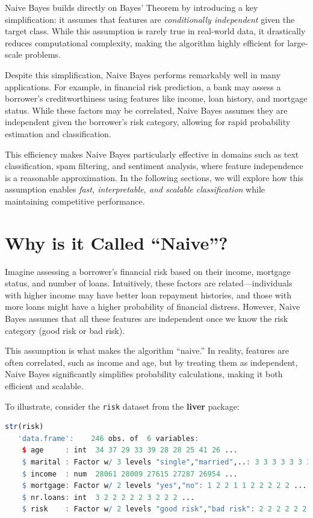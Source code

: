 \documentclass[
  11pt,
]{book}
\newcommand{\passthrough}[1]{#1}
\theoremstyle{definition}
\theoremstyle{definition}
\theoremstyle{definition}
\theoremstyle{definition}
\theoremstyle{remark}
\begin{document}
Naive Bayes builds directly on Bayes' Theorem by introducing a key simplification: it assumes that features are \emph{conditionally independent} given the target class. While this assumption is rarely true in real-world data, it drastically reduces computational complexity, making the algorithm highly efficient for large-scale problems.

Despite this simplification, Naive Bayes performs remarkably well in many applications. For example, in financial risk prediction, a bank may assess a borrower's creditworthiness using features like income, loan history, and mortgage status. While these factors may be correlated, Naive Bayes assumes they are independent given the borrower's risk category, allowing for rapid probability estimation and classification.

This efficiency makes Naive Bayes particularly effective in domains such as text classification, spam filtering, and sentiment analysis, where feature independence is a reasonable approximation. In the following sections, we will explore how this assumption enables \emph{fast, interpretable, and scalable classification} while maintaining competitive performance.

\section{Why is it Called ``Naive''?}\label{why-is-it-called-naive}

Imagine assessing a borrower's financial risk based on their income, mortgage status, and number of loans. Intuitively, these factors are related---individuals with higher income may have better loan repayment histories, and those with more loans might have a higher probability of financial distress. However, Naive Bayes assumes that all these features are independent once we know the risk category (good risk or bad risk).

This assumption is what makes the algorithm ``naive.'' In reality, features are often correlated, such as income and age, but by treating them as independent, Naive Bayes significantly simplifies probability calculations, making it both efficient and scalable.

To illustrate, consider the \passthrough{\lstinline!risk!} dataset from the \textbf{liver} package:

\begin{lstlisting}[language=R]
str(risk)
   'data.frame':    246 obs. of  6 variables:
    $ age     : int  34 37 29 33 39 28 28 25 41 26 ...
    $ marital : Factor w/ 3 levels "single","married",..: 3 3 3 3 3 3 3 3 3 3 ...
    $ income  : num  28061 28009 27615 27287 26954 ...
    $ mortgage: Factor w/ 2 levels "yes","no": 1 2 2 1 1 2 2 2 2 2 ...
    $ nr.loans: int  3 2 2 2 2 2 3 2 2 2 ...
    $ risk    : Factor w/ 2 levels "good risk","bad risk": 2 2 2 2 2 2 2 2 2 2 ...
\end{lstlisting}
\end{document}
